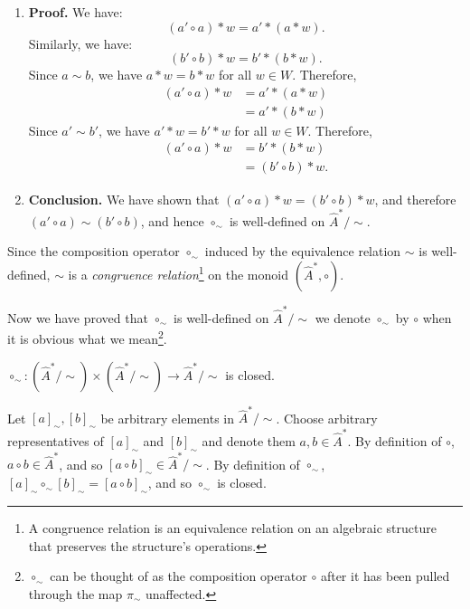 \begin{proofE}
\begin{enumerate}
    \item \textbf{Proof.}
    We have:
    \begin{equation}
      (a' \circ a) \ast w = a' \ast (a \ast w).
    \end{equation}
    Similarly, we have:
    \begin{equation}
      (b' \circ b) \ast w = b' \ast (b \ast w).
    \end{equation}
    Since $a \sim b$, we have $a \ast w = b \ast w$ for all $w \in W$.
    Therefore,
    \begin{align}
        (a' \circ a) \ast w & = a' \ast (a \ast w)\\
        & = a' \ast (b \ast w)
    \end{align}
    Since $a' \sim b'$, we have $a' \ast w = b' \ast w$ for all $w \in W$.
    Therefore,
    \begin{align}
        (a' \circ a) \ast w & = b' \ast (b \ast w) \\
        & = (b' \circ b) \ast w.
    \end{align}

    \item \textbf{Conclusion.}
    We have shown that $(a' \circ a) \ast w = (b' \circ b) \ast w$, and therefore $(a' \circ a) \sim (b' \circ b)$, and hence $\circ_{\sim}$ is well-defined on $\hat{A}^{\ast}/\sim$.
\end{enumerate}
\end{proofE}


Since the composition operator $\circ_{\sim}$ induced by the equivalence relation $\sim$ is well-defined, $\sim$ is a \emph{congruence relation}\footnote{
    A congruence relation is an equivalence relation on an algebraic structure that preserves the structure's operations.
} on the monoid $(\hat{A}^{*}, \circ)$.

\begin{notation}
    Now we have proved that $\circ_{\sim}$ is well-defined on $\hat{A}^{\ast}/\sim$ we denote $\circ_{\sim}$ by $\circ$ when it is obvious what we mean\footnote{
    $\circ_{\sim}$ can be thought of as the composition operator $\circ$ after it has been pulled through the map $\pi_{\sim}$ unaffected.
    }.
\end{notation}


\begin{propositionE}
    \label{prp:circ_sim_closed}
    $\circ_{\sim}: (\hat{A}^{\ast}/\sim) \times (\hat{A}^{\ast}/\sim) \to \hat{A}^{\ast}/\sim$ is closed.
\end{propositionE}
\begin{proofE}
    Let $[a]_{\sim}, [b]_{\sim}$ be arbitrary elements in $\hat{A}^{*}/\sim$.
    Choose arbitrary representatives of $[a]_{\sim}$ and $[b]_{\sim}$ and denote them $a, b \in \hat{A}^{*}$.
    By definition of $\circ$, $a \circ b \in \hat{A}^{*}$, and so $[a \circ b]_{\sim} \in \hat{A}^{*}/\sim$.
    By definition of $\circ_{\sim}$, $[a]_{\sim} \circ_{\sim} [b]_{\sim} = [a \circ b]_{\sim}$, and so $\circ_{\sim}$ is closed.
\end{proofE}

